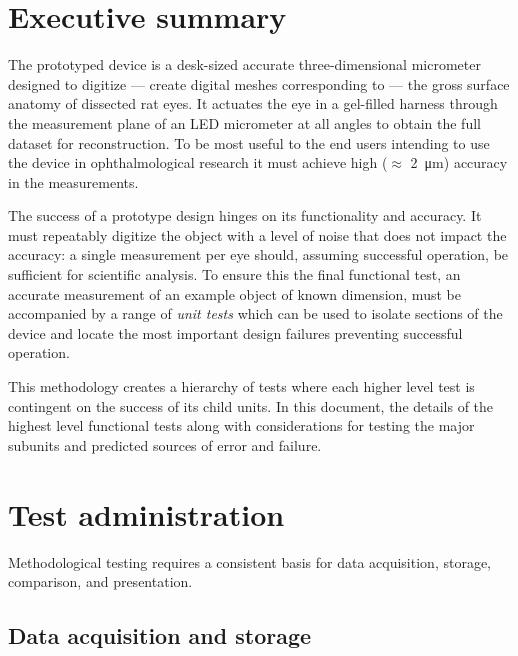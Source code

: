 \documentclass{article}
\begin{document}

\setcounter{tocdepth}{2}
\tableofcontents
\newpage

\section*{Executive summary}
\label{sec:exec-summary}


\newpage

The prototyped device is a desk-sized accurate three-dimensional micrometer designed to digitize --- create digital meshes corresponding to --- the gross surface anatomy of dissected rat eyes. It actuates the eye in a gel-filled harness through the measurement plane of an LED micrometer at all angles to obtain the full dataset for reconstruction. To be most useful to the end users intending to use the device in ophthalmological research it must achieve high ($\approx$ \SI{2}{\micro m}) accuracy in the measurements.

The success of a prototype design hinges on its functionality and accuracy. It must repeatably digitize the object with a level of noise that does not impact the accuracy: a single measurement per eye should, assuming successful operation, be sufficient for scientific analysis. To ensure this the final functional test, an accurate measurement of an example object of known dimension, must be accompanied by a range of \textit{unit tests} which can be used to isolate sections of the device and locate the most important design failures preventing successful operation.

This methodology creates a hierarchy of tests where each higher level test is contingent on the success of its child units. In this document, the details of the highest level functional tests along with considerations for testing the major subunits and predicted sources of error and failure.

\section{Test administration}
\label{sec:test-administration}

Methodological testing requires a consistent basis for data acquisition, storage, comparison, and presentation.

\subsection{Data acquisition and storage}
\label{sec:data-acqu-stor}
\end{document}
